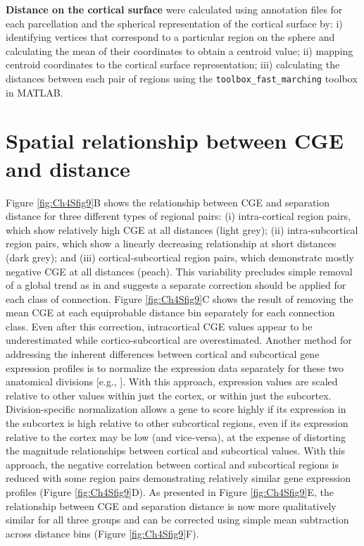 \textbf{Distance on the cortical surface} were calculated using annotation files for each parcellation and the spherical representation of the cortical surface by: i) identifying vertices that correspond to a particular region on the sphere and calculating the mean of their coordinates to obtain a centroid value; ii) mapping centroid coordinates to the cortical surface representation; iii) calculating the distances between each pair of regions using the \texttt{toolbox\_fast\_marching} toolbox in MATLAB.


\section{Spatial relationship between CGE and distance}
\label{app:AppendixCh4_6}

Figure \ref{fig:Ch4Sfig9}B shows the relationship between CGE and separation distance for three different types of regional pairs: (i) intra-cortical region pairs, which show relatively high CGE at all distances (light grey); (ii) intra-subcortical region pairs, which show a linearly decreasing relationship at short distances (dark grey); and (iii) cortical-subcortical region pairs, which demonstrate mostly negative CGE at all distances (peach). This variability precludes simple removal of a global trend as in \citep{Fulcher2016} and suggests a separate correction should be applied for each class of connection. Figure \ref{fig:Ch4Sfig9}C shows the result of removing the mean CGE at each equiprobable distance bin separately for each connection class. Even after this correction, intracortical CGE values appear to be underestimated while cortico-subcortical are overestimated. Another method for addressing the inherent differences between cortical and subcortical gene expression profiles is to normalize the expression data separately for these two anatomical divisions [e.g., \citet{Anderson2018}]. With this approach, expression values are scaled relative to other values within just the cortex, or within just the subcortex. Division-specific normalization allows a gene to score highly if its expression in the subcortex is high relative to other subcortical regions, even if its expression relative to the cortex may be low (and vice-versa), at the expense of distorting the magnitude relationships between cortical and subcortical values. With this approach, the negative correlation between cortical and subcortical regions is reduced with some region pairs demonstrating relatively similar gene expression profiles (Figure \ref{fig:Ch4Sfig9}D). As presented in Figure \ref{fig:Ch4Sfig9}E, the relationship between CGE and separation distance is now more qualitatively similar for all three groups and can be corrected using simple mean subtraction across distance bins (Figure \ref{fig:Ch4Sfig9}F).


